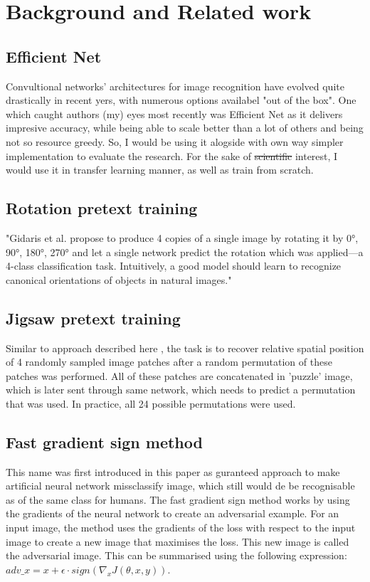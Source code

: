 \documentclass[12pt]{extarticle}
\begin{document}
\section{Background and Related work}

\subsection{Efficient Net}
Convultional networks' architectures for image recognition have evolved quite drastically in recent yers, with numerous options availabel "out of the box". 
One which caught authors (my) eyes most recently was Efficient Net \cite{DBLP:journals/corr/abs-1905-11946} as it delivers impresive accuracy, while being able to scale better than a lot of others and being not so resource greedy. 
So, I would be using it alogside with own way simpler implementation to evaluate the research. For the sake of \st{scientific} interest, I would use it in transfer learning manner, as well as train from scratch. 

\subsection{Rotation pretext training}
\cite{kolesnikov2019revisiting} "Gidaris et al. propose to produce 4 copies of
a single image by rotating it by {0°, 90°, 180°, 270°} and let
a single network predict the rotation which was applied—a
4-class classification task. Intuitively, a good model should
learn to recognize canonical orientations of objects in natural images."

\subsection{Jigsaw pretext training}
Similar to approach described here \cite{kolesnikov2019revisiting},
the task is to recover relative spatial position of
4 randomly sampled image patches after a random permutation of these patches was performed.
All of these patches are concatenated in 'puzzle' image, which is later sent through same network, which needs to predict a permutation that
was used. In practice, all 24 possible permutations were used.


\subsection{Fast gradient sign method}
This name was first introduced in this paper \cite{goodfellow2015explaining} as guranteed approach to make artificial neural network missclassify image, which still would de be recognisable as of the same class for humans. \newline
The fast gradient sign method works by using the gradients of the neural network to create an adversarial example. For an input image, the method uses the gradients of the loss with respect to the input image to create a new image that maximises the loss. This new image is called the adversarial image. This can be summarised using the following expression: $adv\_x = x + \epsilon \cdot sign(\nabla_x J(\theta, x, y))$. 
\end{document}
